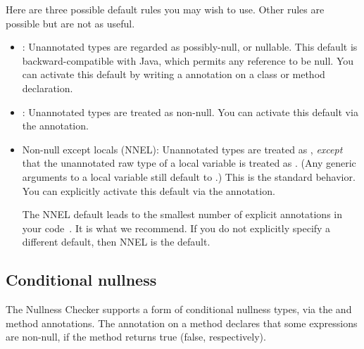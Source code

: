 \begin{sloppy}
Here are three possible default rules you may wish to use.  Other rules are
possible but are not as useful.
\begin{itemize}
\item
  :  Unannotated types are regarded as possibly-null, or
  nullable.  This default is backward-compatible with Java, which permits
  any reference to be null.  You can activate this default by writing
  a  annotation on a
  class or method
  declaration.
\item
  :  Unannotated types are treated as non-null.
  You can activate this
  default via the
   annotation.
\item
  Non-null except locals (NNEL):  Unannotated types are treated as
  , \emph{except} that the
  unannotated raw type of a local variable is treated as
  .  (Any generic arguments to a
  local variable still default to
  .)  This is the standard
  behavior.  You can explicitly activate this default via the
  annotation.

  The NNEL default leads to the smallest number of explicit annotations in
  your code~\cite{PapiACPE2008}.  It is what we recommend.  If you do not
  explicitly specify a different default, then NNEL is the default.
\end{itemize}
\end{sloppy}

\subsection{Conditional nullness\label{conditional-nullness}}

The Nullness Checker supports a form of conditional nullness types, via the
 and  method annotations.
The annotation on a method declares that some expressions are non-null, if
the method returns true (false, respectively).

